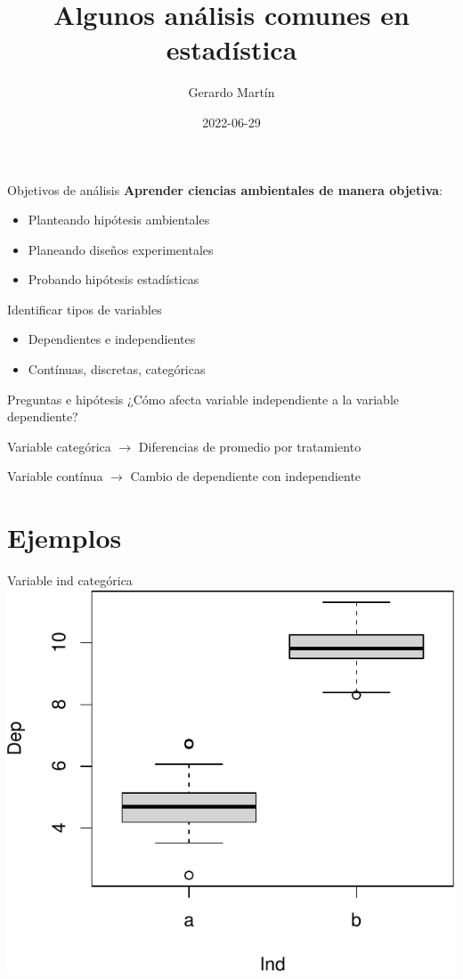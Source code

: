 \documentclass[
  11pt,
  ignorenonframetext,
]{beamer}
\title{Algunos análisis comunes en estadística}
\author{Gerardo Martín}
\date{2022-06-29}
\providecommand{\tightlist}{%
  \setlength{\itemsep}{0pt}\setlength{\parskip}{0pt}}
\begin{document}
\frame{\titlepage}

\begin{frame}{Objetivos de análisis}
\protect\hypertarget{objetivos-de-anuxe1lisis}{}
\textbf{Aprender ciencias ambientales de manera objetiva}:

\begin{itemize}
\tightlist
\item
  Planteando hipótesis ambientales
\item
  Planeando diseños experimentales
\item
  Probando hipótesis estadísticas
\end{itemize}
\end{frame}

\begin{frame}{Identificar tipos de variables}
\protect\hypertarget{identificar-tipos-de-variables}{}
\begin{itemize}
\tightlist
\item
  Dependientes e independientes
\item
  Contínuas, discretas, categóricas
\end{itemize}
\end{frame}

\begin{frame}{Preguntas e hipótesis}
\protect\hypertarget{preguntas-e-hipuxf3tesis}{}
¿Cómo afecta variable independiente a la variable dependiente?

Variable categórica \(\rightarrow\) Diferencias de promedio por
tratamiento

Variable contínua \(\rightarrow\) Cambio de dependiente con
independiente
\end{frame}

\hypertarget{ejemplos}{%
\section{Ejemplos}\label{ejemplos}}

\begin{frame}{Variable ind categórica}
\protect\hypertarget{variable-ind-categuxf3rica}{}
\includegraphics{Pruebas-estadisticas_files/figure-beamer/unnamed-chunk-1-1.pdf}
\end{frame}
\end{document}

